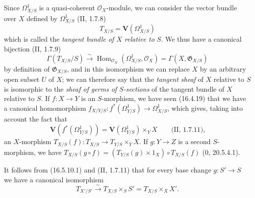 \begin{env}[16.5.12]\label{IV.16.5.12}
Since $\Omega_{X/S}^1$ is a quasi-coherent $\mathcal{O}_X$-module, we can
consider the vector bundle over $X$ defined by $\Omega_{X/S}^1$
(II, 1.7.8)
\[
  T_{X/S}=\mathbf{V}(\Omega_{X/S}^1)
  \tag{16.5.12.1}
  \label{IV.16.5.12.1}
\]
which is called the \emph{tangent bundle of $X$ relative to $S$}. We thus have a
canonical bijection (II, 1.7.9)
\[
  \Gamma(T_{X/S}/S)\xrightarrow{\sim}
  \operatorname{Hom}_{\mathcal{O}_X}(\Omega_{X/S}^1,\mathcal{O}_X)
  =\Gamma(X,\mathfrak{G}_{X/S})
\]
by definition of $\mathfrak{G}_{X/S}$, and in this isomorphism we can
replace $X$ by an arbitrary open subset $U$ of $X$; we can therefore say that the
\emph{tangent sheaf} of $X$ relative to $S$ is isomorphic to the
\emph{sheaf of germs of $S$-sections} of the tangent bundle of $X$
relative to $S$. If $f:X\to Y$ is an $S$-morphism, we have seen (16.4.19)
that we have a canonical homomorphism
$f_{X/Y/S}:f^*(\Omega_{Y/S}^1)\to\Omega_{X/S}^1$, which gives, taking into
account the fact that
\[
  \mathbf{V}(f^*(\Omega_{Y/S}^1))
  =\mathbf{V}(\Omega_{Y/S}^1)\times_Y X\qquad\text{(II, 1.7.11),}
\]
an $X$-morphism
$T_{X/S}(f):T_{X/S}\to T_{Y/S}\times_Y X$. If $g:Y\to Z$ is a second
$S$-morphism, we have
$T_{X/S}(g\circ f)=(T_{Y/S}(g)\times1_X)\circ T_{X/S}(f)$ (0, 20.5.4.1).

It follows from (16.5.10.1) and (II, 1.7.11) that for every base change
$g:S'\to S$ we have a canonical isomorphism
\[
  T_{X'/S'}\xrightarrow{\sim}T_{X/S}\times_S S'
  =T_{X/S}\times_X X'.
  \tag{16.5.12.2}
  \label{IV.16.5.12.2}
\]
\end{env}

